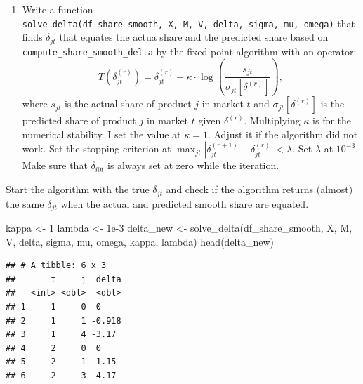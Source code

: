 \documentclass[
]{book}
\newenvironment{Shaded}{\begin{snugshade}}{\end{snugshade}}
\newcommand{\DecValTok}[1]{\textcolor[rgb]{0.00,0.00,0.81}{#1}}
\newcommand{\FloatTok}[1]{\textcolor[rgb]{0.00,0.00,0.81}{#1}}
\newcommand{\FunctionTok}[1]{\textcolor[rgb]{0.00,0.00,0.00}{#1}}
\newcommand{\NormalTok}[1]{#1}
\newcommand{\OtherTok}[1]{\textcolor[rgb]{0.56,0.35,0.01}{#1}}
\newcommand{\SpecialCharTok}[1]{\textcolor[rgb]{0.00,0.00,0.00}{#1}}
\providecommand{\tightlist}{%
  \setlength{\itemsep}{0pt}\setlength{\parskip}{0pt}}
\begin{document}
\begin{enumerate}
\def\labelenumi{\arabic{enumi}.}
\setcounter{enumi}{7}
\tightlist
\item
  Write a function \texttt{solve\_delta(df\_share\_smooth,\ X,\ M,\ V,\ delta,\ sigma,\ mu,\ omega)} that finds \(\delta_{jt}\) that equates the actua share and the predicted share based on \texttt{compute\_share\_smooth\_delta} by the fixed-point algorithm with an operator:
  \[
  T(\delta_{jt}^{(r)}) = \delta_{jt}^{(r)} + \kappa \cdot \log\left(\frac{s_{jt}}{\sigma_{jt}[\delta^{(r)}]}\right),
  \]
  where \(s_{jt}\) is the actual share of product \(j\) in market \(t\) and \(\sigma_{jt}[\delta^{(r)}]\) is the predicted share of product \(j\) in market \(t\) given \(\delta^{(r)}\). Multiplying \(\kappa\) is for the numerical stability. I set the value at \(\kappa = 1\). Adjust it if the algorithm did not work. Set the stopping criterion at \(\max_{jt}|\delta_{jt}^{(r + 1)} - \delta_{jt}^{(r)}| < \lambda\). Set \(\lambda\) at \(10^{-3}\). Make sure that \(\delta_{i0t}\) is always set at zero while the iteration.
\end{enumerate}

Start the algorithm with the true \(\delta_{jt}\) and check if the algorithm returns (almost) the same \(\delta_{jt}\) when the actual and predicted smooth share are equated.

\begin{Shaded}
\begin{Highlighting}[]
\NormalTok{kappa }\OtherTok{\textless{}{-}} \DecValTok{1}
\NormalTok{lambda }\OtherTok{\textless{}{-}} \FloatTok{1e{-}3}
\NormalTok{delta\_new }\OtherTok{\textless{}{-}}
  \FunctionTok{solve\_delta}\NormalTok{(df\_share\_smooth, X, M, V, delta, sigma, mu, omega, kappa, lambda)}
\FunctionTok{head}\NormalTok{(delta\_new)}
\end{Highlighting}
\end{Shaded}

\begin{verbatim}
## # A tibble: 6 x 3
##       t     j  delta
##   <int> <dbl>  <dbl>
## 1     1     0  0    
## 2     1     1 -0.918
## 3     1     4 -3.17 
## 4     2     0  0    
## 5     2     1 -1.15 
## 6     2     3 -4.17
\end{verbatim}

\begin{Shaded}
\end{Shaded}
\end{document}
